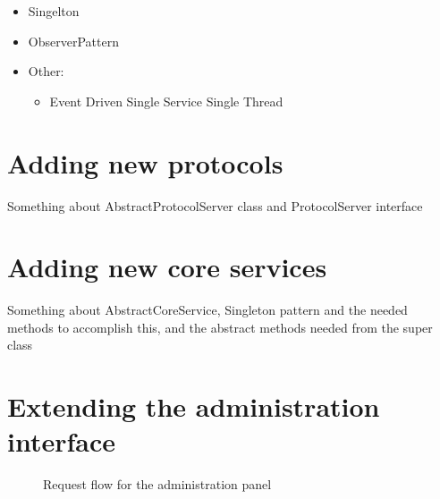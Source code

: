 \begin{itemize}
\item Singelton
\item ObserverPattern
\item Other: \begin{itemize}
\item Event Driven Single Service Single Thread
\end{itemize}
\end{itemize}

\section{Adding new protocols}
\label{sec:adding-new-protocols}

Something about AbstractProtocolServer class and ProtocolServer interface

\section{Adding new core services}
\label{sec:adding-new-core-services}

Something about AbstractCoreService, Singleton pattern and the needed methods to accomplish this, and the abstract methods needed from the super class

\section{Extending the administration interface}
\label{sec:adding-new-panes}

\begin{center}
  \begin{figure}[ht!]
    \caption{Request flow for the administration panel}
    \label{fig:oac-request-flow}
  \end{figure}
\end{center}

